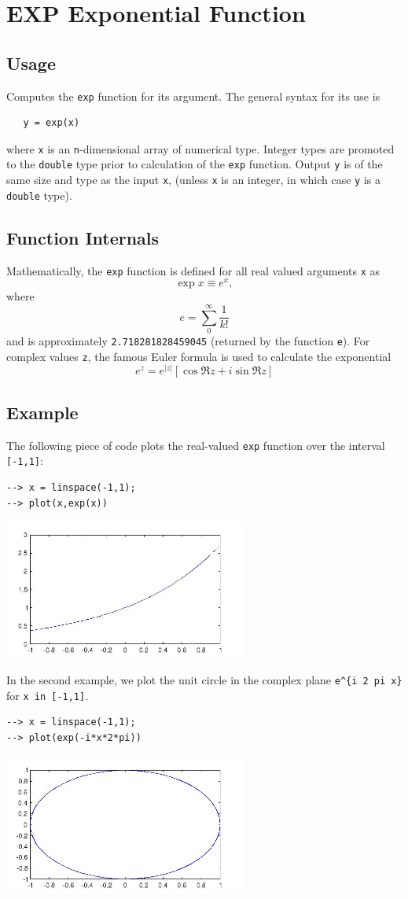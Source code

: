 \section{EXP Exponential Function}

\subsection{Usage}

Computes the \verb|exp| function for its argument.  The general
syntax for its use is
\begin{verbatim}
   y = exp(x)
\end{verbatim}
where \verb|x| is an \verb|n|-dimensional array of numerical type.
Integer types are promoted to the \verb|double| type prior to
calculation of the \verb|exp| function.  Output \verb|y| is of the
same size and type as the input \verb|x|, (unless \verb|x| is an
integer, in which case \verb|y| is a \verb|double| type).
\subsection{Function Internals}

Mathematically, the \verb|exp| function is defined for all real
valued arguments \verb|x| as
\[
  \exp x \equiv e^{x},
\]
where
\[
  e = \sum_{0}^{\infty} \frac{1}{k!}
\]
and is approximately \verb|2.718281828459045| (returned by the function 
\verb|e|).  For complex values
\verb|z|, the famous Euler formula is used to calculate the 
exponential
\[
  e^{z} = e^{|z|} \left[ \cos \Re z + i \sin \Re z \right]
\]
\subsection{Example}

The following piece of code plots the real-valued \verb|exp|
function over the interval \verb|[-1,1]|:
\begin{verbatim}
--> x = linspace(-1,1);
--> plot(x,exp(x))
\end{verbatim}


\centerline{\includegraphics[width=8cm]{expplot1}}

In the second example, we plot the unit circle in the 
complex plane \verb|e^{i 2 pi x}| for \verb|x in [-1,1]|.
\begin{verbatim}
--> x = linspace(-1,1);
--> plot(exp(-i*x*2*pi))
\end{verbatim}


\centerline{\includegraphics[width=8cm]{expplot2}}

